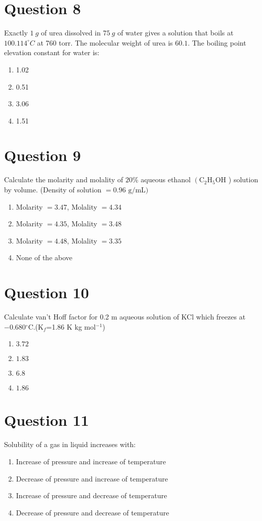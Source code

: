 \documentclass{article}
\begin{document}
\section*{Question 8}
Exactly \(1 {~g}\) of urea dissolved in \(75 {~g}\) of water gives a solution that boils at \(100.114^{\circ} {C}\) at 760 torr. The molecular weight of urea is \(60.1\). The boiling point elevation constant for water is:
\begin{enumerate}[label=(\alph*)]
\item 1.02
\item 0.51
\item 3.06
\item 1.51
\end{enumerate}
\newpage
\section*{Question 9}
Calculate the molarity and molality of \(20 \%\) aqueous ethanol \(\left(\mathrm{C}_2 \mathrm{H}_5 \mathrm{OH}\right.\) ) solution by volume. (Density of solution \(=0.96\) \(\mathrm{g} / \mathrm{mL})\)
\begin{enumerate}[label=(\alph*)]
\item Molarity \(=3.47\), Molality \(=4.34\)
\item Molarity \(=4.35\), Molality \(=3.48\)
\item Molarity \(=4.48\), Molality \(=3.35\)
\item None of the above
\end{enumerate}
\newpage
\section*{Question 10}
Calculate van't Hoff factor for 0.2 m aqueous solution of KCl which freezes at −0.680\(^{\circ}\)C.(K$_{f}$=1.86 K kg mol$^{−1}$)\newline
\begin{enumerate}[label=(\alph*)]
\item \(3.72\)
\item \(1.83\)
\item \(6.8\)
\item \(1.86\)
\end{enumerate}
\newpage
\section*{Question 11}
Solubility of a gas in liquid increases with:
\begin{enumerate}[label=(\alph*)]
\item Increase of pressure and increase of temperature
\item Decrease of pressure and increase of temperature
\item Increase of pressure and decrease of temperature
\item Decrease of pressure and decrease of temperature
\end{enumerate}
\newpage
\end{document}
